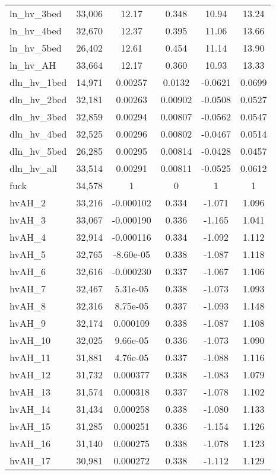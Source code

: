 \begin{tabular}{lccccc}
ln\_hv\_3bed & 33,006 & 12.17 & 0.348 & 10.94 & 13.24 \\
ln\_hv\_4bed & 32,670 & 12.37 & 0.395 & 11.06 & 13.66 \\
ln\_hv\_5bed & 26,402 & 12.61 & 0.454 & 11.14 & 13.90 \\
ln\_hv\_AH & 33,664 & 12.17 & 0.360 & 10.93 & 13.33 \\
dln\_hv\_1bed & 14,971 & 0.00257 & 0.0132 & -0.0621 & 0.0699 \\
dln\_hv\_2bed & 32,181 & 0.00263 & 0.00902 & -0.0508 & 0.0527 \\
dln\_hv\_3bed & 32,859 & 0.00294 & 0.00807 & -0.0562 & 0.0547 \\
dln\_hv\_4bed & 32,525 & 0.00296 & 0.00802 & -0.0467 & 0.0514 \\
dln\_hv\_5bed & 26,285 & 0.00295 & 0.00814 & -0.0428 & 0.0457 \\
dln\_hv\_all & 33,514 & 0.00291 & 0.00811 & -0.0525 & 0.0612 \\
fuck & 34,578 & 1 & 0 & 1 & 1 \\
hvAH\_2 & 33,216 & -0.000102 & 0.334 & -1.071 & 1.096 \\
hvAH\_3 & 33,067 & -0.000190 & 0.336 & -1.165 & 1.041 \\
hvAH\_4 & 32,914 & -0.000116 & 0.334 & -1.092 & 1.112 \\
hvAH\_5 & 32,765 & -8.60e-05 & 0.338 & -1.087 & 1.118 \\
hvAH\_6 & 32,616 & -0.000230 & 0.337 & -1.067 & 1.106 \\
hvAH\_7 & 32,467 & 5.31e-05 & 0.338 & -1.073 & 1.093 \\
hvAH\_8 & 32,316 & 8.75e-05 & 0.337 & -1.093 & 1.148 \\
hvAH\_9 & 32,174 & 0.000109 & 0.338 & -1.087 & 1.108 \\
hvAH\_10 & 32,025 & 9.66e-05 & 0.336 & -1.073 & 1.090 \\
hvAH\_11 & 31,881 & 4.76e-05 & 0.337 & -1.088 & 1.116 \\
hvAH\_12 & 31,732 & 0.000377 & 0.338 & -1.083 & 1.079 \\
hvAH\_13 & 31,574 & 0.000318 & 0.337 & -1.078 & 1.102 \\
hvAH\_14 & 31,434 & 0.000258 & 0.338 & -1.080 & 1.133 \\
hvAH\_15 & 31,285 & 0.000251 & 0.336 & -1.154 & 1.126 \\
hvAH\_16 & 31,140 & 0.000275 & 0.338 & -1.078 & 1.123 \\
hvAH\_17 & 30,981 & 0.000272 & 0.338 & -1.112 & 1.129 \\

\end{tabular}
